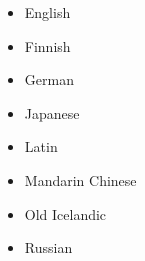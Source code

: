 \begin{itemize}
\item English   \citep{MIF85a,SN86a,Hudson89a,ST91a-u}
\item Finnish    \citep*{NJL84a-u,JLV86a-u}
\item German     \citep{Hellwig86a-u,Hellwig2003a,Hellwig2006a,MS98c-u,GK2001a}
\item Japanese \citep*{MIF85a}
\item Latin       \citep{Covington90a}
\item Mandarin Chinese \citep{LW2006a-u,Liu2009a-u}
\item Old Icelandic \citep{Maas77a}
\item Russian   \citep{HZ60a-u,Melcuk64a-u,Covington90a}


  





\end{itemize}
